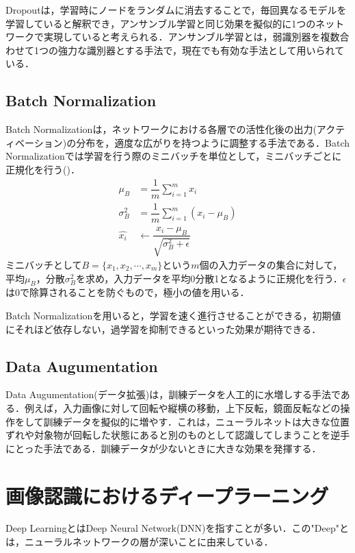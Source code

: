 Dropoutは，学習時にノードをランダムに消去することで，毎回異なるモデルを学習していると解釈でき，アンサンブル学習と同じ効果を擬似的に1つのネットワークで実現していると考えられる．アンサンブル学習とは，弱識別器を複数合わせて1つの強力な識別器とする手法で，現在でも有効な手法として用いられている．

\subsection*{Batch Normalization}
Batch Normalization\cite{BatchNorm}は，ネットワークにおける各層での活性化後の出力(アクティベーション)の分布を，適度な広がりを持つように調整する手法である．Batch Normalizationでは学習を行う際のミニバッチを単位として，ミニバッチごとに正規化を行う()．
\begin{align}\label{eq:BatchNorm}
	\mu_B & = \dfrac{1}{m}\sum_{i=1}^m x_i \\
	\sigma_B^2 & = \dfrac{1}{m}\sum_{i=1}^m (x_i - \mu_B) \\
	\hat{x_i} & \leftarrow \dfrac{x_i - \mu_B}{\sqrt{\sigma_B^2 + \epsilon}}
\end{align}
ミニバッチとして$B = \{x_1, x_2, \cdots, x_m\}$という$m$個の入力データの集合に対して，平均$\mu_B$，分散$\sigma_B^2$を求め，入力データを平均0分散1となるように正規化を行う．$\epsilon$は0で除算されることを防ぐもので，極小の値を用いる．

Batch Normalizationを用いると，学習を速く進行させることができる，初期値にそれほど依存しない，過学習を抑制できるといった効果が期待できる．

\subsection*{Data Augumentation}
Data Augumentation(データ拡張)は，訓練データを人工的に水増しする手法である．例えば，入力画像に対して回転や縦横の移動，上下反転，鏡面反転などの操作をして訓練データを擬似的に増やす．これは，ニューラルネットは大きな位置ずれや対象物が回転した状態にあると別のものとして認識してしまうことを逆手にとった手法である．訓練データが少ないときに大きな効果を発揮する．


\section{画像認識におけるディープラーニング}
Deep LearningとはDeep Neural Network(DNN)を指すことが多い．この"Deep"とは，ニューラルネットワークの層が深いことに由来している．

